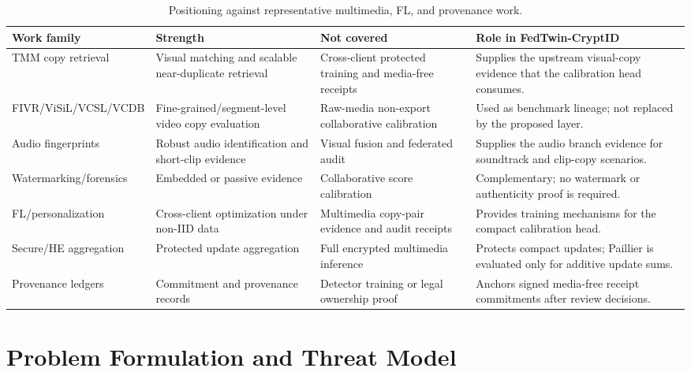 \documentclass[journal]{IEEEtran}
\newcommand{\ours}{FedTwin-CryptID}
\begin{document}
\begin{table}[!t]
\centering
\caption{Positioning against representative multimedia, FL, and provenance work.}
\label{tab:positioning}
\scriptsize
\begin{tabularx}{\textwidth}{p{} p{} p{} X}
\toprule
Work family & Strength & Not covered & Role in \ours{} \\
\midrule
TMM copy retrieval \cite{wu2009realtime,douze2010image,chou2015pattern} & Visual matching and scalable near-duplicate retrieval & Cross-client protected training and media-free receipts & Supplies the upstream visual-copy evidence that the calibration head consumes. \\
FIVR/ViSiL/VCSL/VCDB \cite{kordopatis2019fivr,kordopatis2019visil,feng2022vcsl,jiang2015vcdb} & Fine-grained/segment-level video copy evaluation & Raw-media non-export collaborative calibration & Used as benchmark lineage; not replaced by the proposed layer. \\
Audio fingerprints \cite{wang2003shazam,cano2005review,baluja2008waveprint} & Robust audio identification and short-clip evidence & Visual fusion and federated audit & Supplies the audio branch evidence for soundtrack and clip-copy scenarios. \\
Watermarking/forensics \cite{cayre2005watermarking,cox2007watermarking,sitara2018digital} & Embedded or passive evidence & Collaborative score calibration & Complementary; no watermark or authenticity proof is required. \\
FL/personalization \cite{mcmahan2017fedavg,li2020fedprox,reddi2021fedopt,li2021ditto} & Cross-client optimization under non-IID data & Multimedia copy-pair evidence and audit receipts & Provides training mechanisms for the compact calibration head. \\
Secure/HE aggregation \cite{bonawitz2017secureagg,paillier1999public,cheon2017ckks} & Protected update aggregation & Full encrypted multimedia inference & Protects compact updates; Paillier is evaluated only for additive update sums. \\
Provenance ledgers \cite{bui2020archangel,c2pa2026spec,weng2016multiparty} & Commitment and provenance records & Detector training or legal ownership proof & Anchors signed media-free receipt commitments after review decisions. \\
\bottomrule
\end{tabularx}
\end{table}

\section{Problem Formulation and Threat Model}
\end{document}
